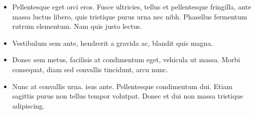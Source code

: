 \documentclass[landscape,a4paper,fontscale=1.2,margin=.25in]{styles/baposter}
\begin{document}
\begin{cheatsheet}
{\begin{multicols}{2}

\begin{itemize}\compresslist
\item Pellentesque eget orci eros. Fusce ultricies, tellus et pellentesque fringilla, ante massa luctus libero, quis tristique purus urna nec nibh. Phasellus fermentum rutrum elementum. Nam quis justo lectus.
\item Vestibulum sem ante, hendrerit a gravida ac, blandit quis magna.
\item Donec sem metus, facilisis at condimentum eget, vehicula ut massa. Morbi consequat, diam sed convallis tincidunt, arcu nunc.
\item Nunc at convallis urna. isus ante. Pellentesque condimentum dui. Etiam sagittis purus non tellus tempor volutpat. Donec et dui non massa tristique adipiscing.
\end{itemize}

\end{multicols}
}


\end{cheatsheet}
\end{document}
